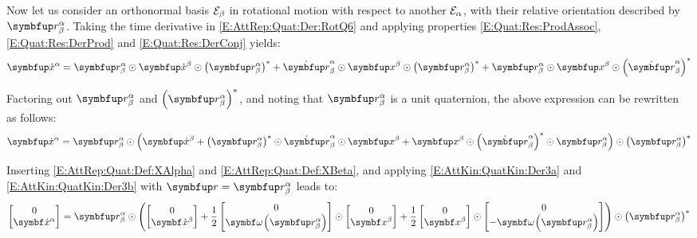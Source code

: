 Now let us consider an orthonormal basis $\basis[\beta]$ in rotational motion with respect to another $\basis[\alpha]$, with their relative orientation described by $\RotQ{\alpha}{\beta}$. Taking the time derivative in \eqref{E:AttRep:Quat:Der:RotQ6} and applying properties \eqref{E:Quat:Res:ProdAssoc}, \eqref{E:Quat:Res:DerProd} and \eqref{E:Quat:Res:DerConj} yields:
\begin{equation*}
	\qprj{\dot{x}}{\alpha} =
	\RotQ{\alpha}{\beta} \qprod \qprj{\dot{x}}{\beta} \qprod \RotQcon{\alpha}{\beta} + 
	\RotQdot{\alpha}{\beta} \qprod \qprj{x}{\beta} \qprod \RotQcon{\alpha}{\beta} +
	\RotQ{\alpha}{\beta} \qprod \qprj{x}{\beta} \qprod \RotQdotcon{\alpha}{\beta}
\end{equation*}

Factoring out $\RotQ{\alpha}{\beta}$ and $\RotQcon{\alpha}{\beta}$, and noting that $\RotQ{\alpha}{\beta}$ is a unit quaternion, the above expression can be rewritten as follows:
\begin{equation*}
	\qprj{\dot{x}}{\alpha} =
	\RotQ{\alpha}{\beta} \qprod
	\left( \qprj{\dot{x}}{\beta} + \RotQcon{\alpha}{\beta} \qprod \RotQdot{\alpha}{\beta} \qprod \qprj{x}{\beta} +
	\qprj{x}{\beta} \qprod \RotQdotcon{\alpha}{\beta} \qprod \RotQ{\alpha}{\beta} \right) \qprod
	\RotQcon{\alpha}{\beta} 
\end{equation*}

\begin{comment}
	\qprj{\dot{x}}{\alpha} =
	\RotQ{\alpha}{\beta} \qprod
	\left( \RotQcon{\alpha}{\beta} \qprod \RotQdot{\alpha}{\beta} \qprod \qprj{x}{\beta} \qprod \RotQcon{\alpha}{\beta} \qprod \RotQ{\alpha}{\beta} +
	\RotQcon{\alpha}{\beta} \qprod \RotQ{\alpha}{\beta} \qprod \qprj{x}{\beta} \qprod \RotQdotcon{\alpha}{\beta} \qprod \RotQ{\alpha}{\beta} \right) \qprod
	\RotQcon{\alpha}{\beta} \\
\end{comment}

Inserting \eqref{E:AttRep:Quat:Def:XAlpha} and \eqref{E:AttRep:Quat:Def:XBeta}, and applying \eqref{E:AttKin:QuatKin:Der3a} and \eqref{E:AttKin:QuatKin:Der3b} with $\quat{\rotq} = \RotQ{\alpha}{\beta}$ leads to:
\begin{equation*}
	\qcol{0}{\vprj{\dot{x}}{\alpha}} = \RotQ{\alpha}{\beta} \qprod
	\left( \qcol{0}{\vprj{\dot{x}}{\beta}} + \dfrac{1}{2} \qcol{0}{\qvangv{\RotQ{\alpha}{\beta}}} \qprod
	\qcol{0}{\vprj{x}{\beta}} + \dfrac{1}{2} \qcol{0}{\vprj{x}{\beta}} \qprod
	\qcol{0}{- \qvangv{\RotQ{\alpha}{\beta}}} \right) \qprod \RotQcon{\alpha}{\beta}
\end{equation*}

